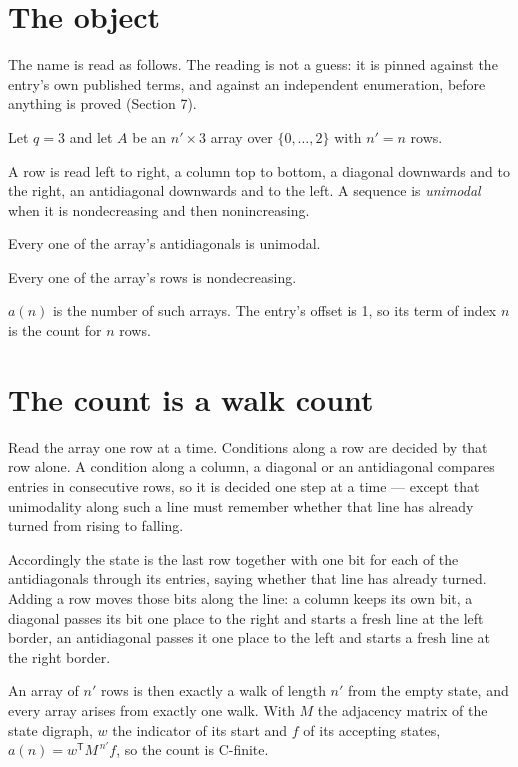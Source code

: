 \documentclass[11pt]{article}
\theoremstyle{definition}
\begin{document}
\section{The object}

The name is read as follows. The reading is not a guess: it is pinned against the entry's own published terms, and against an independent enumeration, before anything is proved (Section 7).

Let $q = 3$ and let $A$ be an $n' \times 3$ array over $\{0,\dots,2\}$ with $n' = n$ rows.

A row is read left to right, a column top to bottom, a diagonal downwards and to the right, an antidiagonal downwards and to the left. A sequence is {\itshape unimodal} when it is nondecreasing and then nonincreasing.

Every one of the array's antidiagonals is unimodal.

Every one of the array's rows is nondecreasing.

$a(n)$ is the number of such arrays. The entry's offset is 1, so its term of index $n$ is the count for $n$ rows.

\section{The count is a walk count}

Read the array one row at a time. Conditions along a row are decided by that row alone. A condition along a column, a diagonal or an antidiagonal compares entries in consecutive rows, so it is decided one step at a time --- except that unimodality along such a line must remember whether that line has already turned from rising to falling.

Accordingly the state is the last row together with one bit for each of the antidiagonals through its entries, saying whether that line has already turned. Adding a row moves those bits along the line: a column keeps its own bit, a diagonal passes its bit one place to the right and starts a fresh line at the left border, an antidiagonal passes it one place to the left and starts a fresh line at the right border.

An array of $n'$ rows is then exactly a walk of length $n'$ from the empty state, and every array arises from exactly one walk. With $M$ the adjacency matrix of the state digraph, $w$ the indicator of its start and $f$ of its accepting states, $a(n) = w^{\mathsf T}M^{\,n'}f$, so the count is C-finite.
\end{document}
